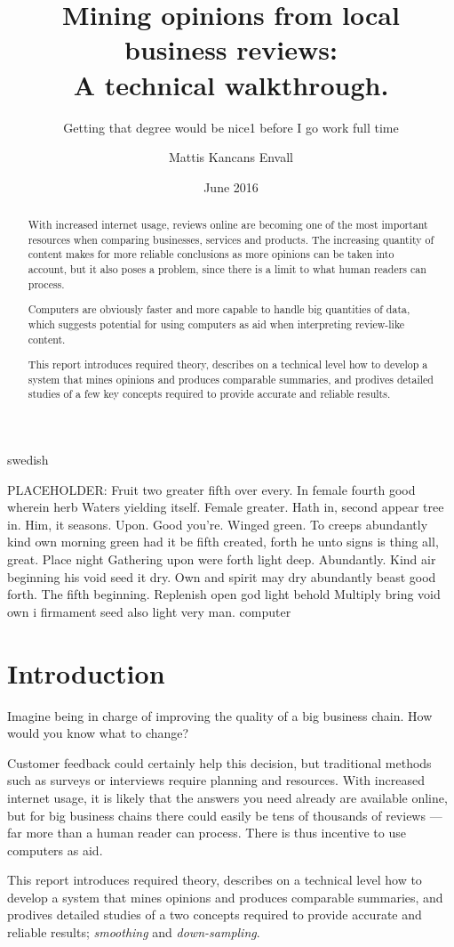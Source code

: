 \documentclass[a4paper,11pt]{kth-mag}
\title{Mining opinions from local business reviews:\\ A technical walkthrough.}
\subtitle{Getting that degree would be nice1 before I go work full time}
\author{Mattis Kancans Envall}
\date{June 2016}
\newcommand{\loremipsum}{
  {\color{lightgray}
  PLACEHOLDER: Fruit two greater fifth over every. In female fourth good wherein herb
  Waters yielding itself. Female greater. Hath in, second appear tree in.
  Him, it seasons. Upon. Good you're. Winged green. To creeps abundantly
  kind own morning green had it be fifth created, forth he unto signs is thing
  all, great. Place night Gathering upon were forth light deep. Abundantly.
  Kind air beginning his void seed it dry. Own and spirit may dry abundantly
  beast good forth. The fifth beginning. Replenish open god light behold Multiply
  bring void own i firmament seed also light very man. \gls{computer}

  }
}
\begin{document}
\frontmatter
\pagestyle{empty}
\removepagenumbers
\maketitle
{}
\begin{abstract}
With increased internet usage, reviews online are becoming one of the most important resources when comparing businesses, services and products.
The increasing quantity of content makes for more reliable conclusions as more opinions can be taken into account, but it also poses a problem,
since there is a limit to what human readers can process.

Computers are obviously faster and more capable to handle big quantities of data, which suggests potential for using computers as aid when
interpreting review-like content.

This report introduces required theory, describes on a technical level how to develop a system that
mines opinions and produces comparable summaries, and prodives detailed studies of a few key concepts required
to provide accurate and reliable results.
\end{abstract}


\clearpage
\begin{foreignabstract}{swedish}
\loremipsum

\end{foreignabstract}
\clearpage
\tableofcontents*

\glsaddall

\mainmatter
\pagestyle{newchap}
\chapter{Introduction}
Imagine being in charge of improving the quality of a big business chain. How would you know what to change?

Customer feedback could certainly help this decision, but traditional methods such as surveys or interviews
require planning and resources. With increased internet usage, it is likely that the answers you need already
are available online, but for big business chains there could easily be tens of thousands of reviews ---
far more than a human reader can process. There is thus incentive to use computers as aid.

This report introduces required theory, describes on a technical level how to develop a system that
mines opinions and produces comparable summaries, and prodives detailed studies of a two concepts
required to provide accurate and reliable results; \emph{smoothing} and \emph{down-sampling}.
\end{document}
